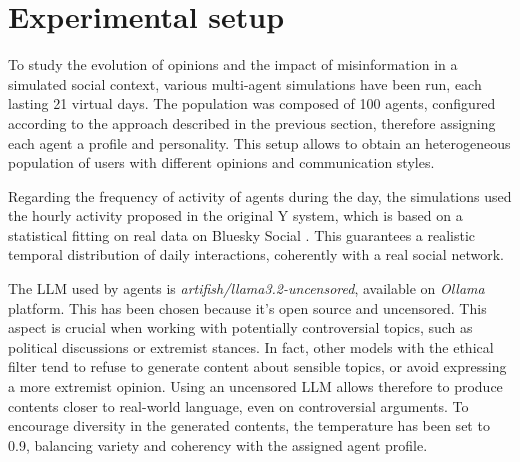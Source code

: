 \section{Experimental setup}
\label{sec:experiments}


To study the evolution of opinions and the impact of misinformation in a simulated social context, various multi-agent simulations have been run, each lasting 21 virtual days.
The population was composed of 100 agents, configured according to the approach described in the previous section, therefore assigning each agent a profile and personality.
This setup allows to obtain an heterogeneous population of users with different opinions and communication styles.

Regarding the frequency of activity of agents during the day, the simulations used the hourly activity proposed in the original Y system, which is based on a statistical fitting on real data on Bluesky Social \cite{rossetti2024ysocialllmpoweredsocial, failla2024}.
This guarantees a realistic temporal distribution of daily interactions, coherently with a real social network.

\medskip
The LLM used by agents is \textit{artifish/llama3.2-uncensored}, available on \textit{Ollama} platform. 
This has been chosen because it's open source and uncensored.
This aspect is crucial when working with potentially controversial topics, such as political discussions or extremist stances.
In fact, other models with the ethical filter tend to refuse to generate content about sensible topics, or avoid expressing a more extremist opinion.
Using an uncensored LLM allows therefore to produce contents closer to real-world language, even on controversial arguments.
To encourage diversity in the generated contents, the temperature has been set to 0.9, balancing variety and coherency with the assigned agent profile.

